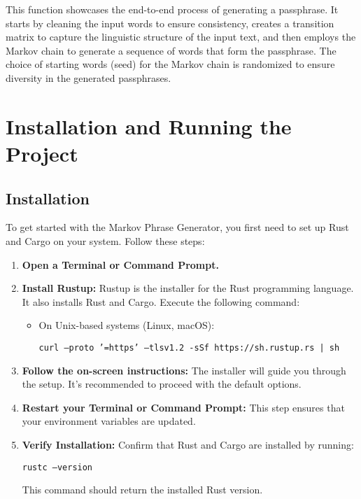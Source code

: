 \documentclass[a4paper,12pt]{article}
\begin{document}
This function showcases the end-to-end process of generating a passphrase. It starts by cleaning the input words to ensure consistency, creates a transition matrix to capture the linguistic structure of the input text, and then employs the Markov chain to generate a sequence of words that form the passphrase. The choice of starting words (seed) for the Markov chain is randomized to ensure diversity in the generated passphrases.

\section{Installation and Running the Project}

\subsection{Installation}

To get started with the Markov Phrase Generator, you first need to set up Rust and Cargo on your system. Follow these steps:

\begin{enumerate}
    \item \textbf{Open a Terminal or Command Prompt.}

    \item \textbf{Install Rustup:}
    Rustup is the installer for the Rust programming language. It also installs Rust and Cargo. Execute the following command:

    \begin{itemize}
        \item On Unix-based systems (Linux, macOS):
        
        \texttt{curl --proto '=https' --tlsv1.2 -sSf https://sh.rustup.rs | sh}
    \end{itemize}

    \item \textbf{Follow the on-screen instructions:}
    The installer will guide you through the setup. It's recommended to proceed with the default options.

    \item \textbf{Restart your Terminal or Command Prompt:}
    This step ensures that your environment variables are updated.

    \item \textbf{Verify Installation:}
    Confirm that Rust and Cargo are installed by running:

    \texttt{rustc --version}

    This command should return the installed Rust version.
\end{enumerate}
\end{document}
